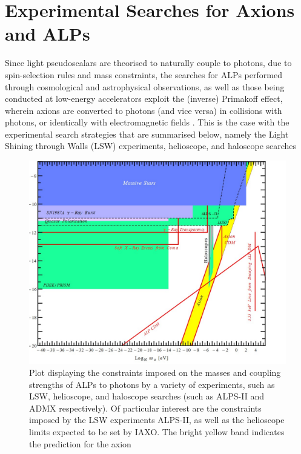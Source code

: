 \section{Experimental Searches for Axions and ALPs}\label{ALPExpt} 
Since light pseudoscalars are theorised to naturally couple to photons, due to spin-selection rules and mass constraints, the searches for ALPs performed through cosmological and astrophysical observations, as well as those
being conducted at low-energy accelerators exploit the (inverse) Primakoff effect, wherein axions are converted to photons (and vice versa) in collisions with photons, or identically with electromagnetic fields \cite{d'Enterria:2753504}. This is the case with the experimental search strategies
that are summarised below, namely the Light Shining through Walls (LSW) experiments, helioscope, and haloscope searches
\begin{figure}[H]
    \centering      
    \includegraphics[scale = 0.45]{ALPExperimentalConstraints.jpg}
    \caption{Plot displaying the constraints imposed on the masses and coupling strengths of ALPs to photons by a variety of experiments, such as LSW, helioscope, and haloscope searches (such as ALPS-II and ADMX respectively). Of particular interest are the constraints imposed by the LSW experiments ALPS-II, as well as the helioscope limits expected to be set by IAXO. The bright yellow band indicates
    the prediction for the axion}
    \label{ALPExperimentalConstraints}
\end{figure}
